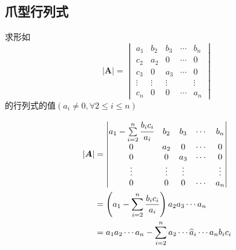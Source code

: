\subsection{爪型行列式}
\begin{brown}
\begin{example}
  求形如
\[
\left|\bm{A}\right|
=
\begin{vmatrix}
    a_1 & b_2 & b_3 &\cdots& b_n\\
    c_2 & a_2 &0 &\cdots & 0\\
    c_3 & 0 & a_3 & \cdots & 0\\
    \vdots &\vdots&\vdots&&\vdots\\
    c_n & 0&0&\cdots& a_n
\end{vmatrix}
\]
的行列式的值$\left(a_i\neq 0,\forall 2 \leqslant 
i\leqslant n\right)$
\end{example}
\begin{solution}
\begin{align*}
    \left|\bm{A}\right|&=
    \begin{vmatrix}
        a_1-\sum\limits_{i = 2}
    ^{n}\cfrac{b_ic_i}{a_i}&b_2&b_3&\cdots&b_n\\
    0&a_2&0&\cdots&0\\
    0&0&a_3&\cdots&0\\
    \vdots&\vdots&\vdots&&\vdots\\
    0&0&0&\cdots&a_n
    \end{vmatrix}\\
    &=
    \left(a_1-\sum_{i = 2}
    ^{n}\frac{b_ic_i}{a_i}\right)a_2a_3\cdots a_n\\
&=a_1a_2\cdots a_n-
\sum_{i = 2}^{n}a_2\cdots\widehat{a}_i\cdots
a_nb_ic_i
\end{align*}
\end{solution}
\end{brown}
